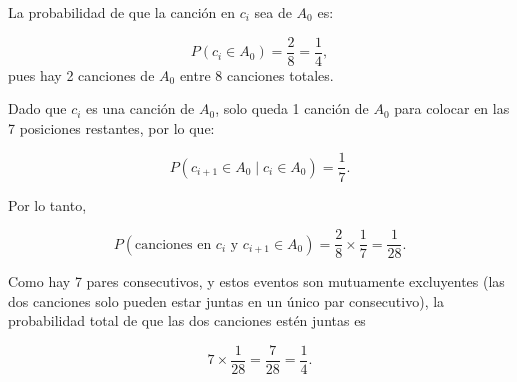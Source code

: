 La probabilidad de que la canción en \(c_i\) sea de \(A_0\) es:

\[
P(c_i \in A_0) = \frac{2}{8} = \frac{1}{4},
\]
pues hay 2 canciones de \(A_0\) entre 8 canciones totales.

Dado que \(c_i\) es una canción de \(A_0\), solo queda 1 canción de \(A_0\) para colocar en las 7 posiciones restantes, por lo que:

\[
P(c_{i+1} \in A_0 \mid c_i \in A_0) = \frac{1}{7}.
\]

Por lo tanto,

\[
P(\text{canciones en } c_i \text{ y } c_{i+1} \in A_0) = \frac{2}{8} \times \frac{1}{7} = \frac{1}{28}.
\]

Como hay 7 pares consecutivos, y estos eventos son mutuamente excluyentes (las dos canciones solo pueden estar juntas en un único par consecutivo), la probabilidad total de que las dos canciones estén juntas es

\[
7 \times \frac{1}{28} = \frac{7}{28} = \frac{1}{4}.
\]